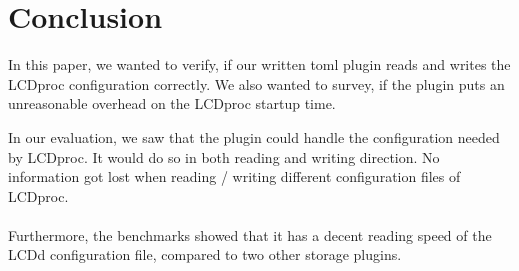\documentclass[draft,final]{vutinfth} %
\begin{document}
\chapter{Conclusion}
In this paper, we wanted to verify, if our written \acrshort{toml} plugin reads and writes the LCDproc configuration correctly.
We also wanted to survey, if the plugin puts an unreasonable overhead on the LCDproc startup time.

In our evaluation, we saw that the plugin could handle the configuration needed by LCDproc.
It would do so in both reading and writing direction.
No information got lost when reading / writing different configuration files of LCDproc.
\\\\
Furthermore, the benchmarks showed that it has a decent reading speed of the LCDd configuration file, compared to two other storage plugins.

\backmatter

\listoffigures

\listoftables


\printglossary[type=\acronymtype]

{}

\end{document}
